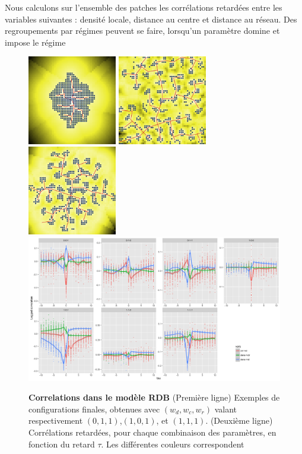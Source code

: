\documentclass[french]{./sageo}
\begin{document}
Nous calculons sur l'ensemble des patches les corrélations retardées entre les variables suivantes : densité locale, distance au centre et distance au réseau. Des regroupements par régimes peuvent se faire, lorsqu'un paramètre domine et impose le régime




\begin{figure}[h]
\centering
\includegraphics[width=3.9cm]{figures/ex_60_wdens0_wroad1_wcenter1_seed272727}
\includegraphics[width=3.9cm]{figures/ex_60_wdens1_wroad1_wcenter0_seed272727}
\includegraphics[width=3.9cm]{figures/ex_60_wdens1_wroad1_wcenter1_seed272727}\\\vspace{0.2cm}
\includegraphics[width=12cm]{figures/laggedcorrs_facetextreme}
\caption{\textbf{Correlations dans le modèle RDB} (Première ligne) Exemples de configurations finales, obtenues avec $(w_{d},w_{c},w_{r})$ valant respectivement $(0,1,1)$,$(1,0,1)$, et $(1,1,1)$. (Deuxième ligne) Corrélations retardées, pour chaque combinaison des paramètres, en fonction du retard $\tau$. Les différentes couleurs correspondent }
\label{fig:exrdb}
\end{figure}
\end{document}
